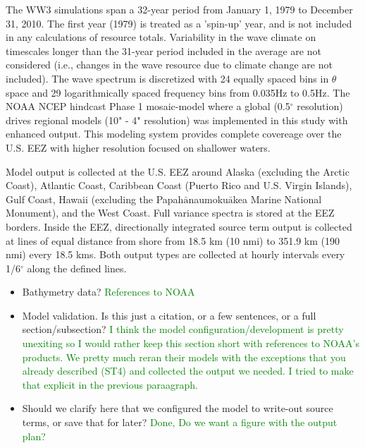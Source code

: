 The WW3 simulations span a 32-year period from January 1, 1979 to December 31, 2010. The first year (1979) is treated as a 'spin-up' year, and is not included in any calculations of resource totals. Variability in the wave climate on timescales longer than the 31-year period included in the average are not considered (i.e., changes in the wave resource due to climate change are not included). The wave spectrum is discretized with 24 equally spaced bins in $\theta$ space and 29 logarithmically spaced frequency bins from 0.035Hz to 0.5Hz. The NOAA NCEP hindcast Phase 1 mosaic-model  where a global (0.5$^{\circ}$ resolution) drives regional models (10" - 4" resolution) was implemented in this study with enhanced output. This modeling system provides complete covereage over the U.S. EEZ with higher resolution focused on shallower waters.

Model output is collected at the U.S. EEZ around Alaska (excluding the Arctic Coast), Atlantic Coast, Caribbean Coast (Puerto Rico and U.S. Virgin Islands), Gulf Coast, Hawaii (excluding the Papah$\bar{\text{a}}$naumoku$\bar{\text{a}}$kea Marine National Monument), and the West Coast. Full variance spectra is stored at the EEZ borders. Inside the EEZ, directionally integrated source term output is collected at lines of equal distance from shore from 18.5 km (10 nmi) to 351.9 km (190 nmi) every 18.5 kms. Both output types are collected at hourly intervals every 1/6$^{\circ}$ along the defined lines.



\begin{itemize}
\item Bathymetry data? \textcolor{green}{References to NOAA}
\item Model validation. Is this just a citation, or a few sentences, or a full section/subsection? \textcolor{green}{I think the model configuration/development is pretty unexiting so I would rather keep this section short with references to NOAA's products. We pretty much reran their models with the exceptions that you already described (ST4) and collected the output we needed. I tried to make that explicit in the previous paraagraph.}
\item Should we clarify here that we configured the model to write-out source terms, or save that for later? \textcolor{green}{Done, Do we want a figure with the output plan?}
\end{itemize}


